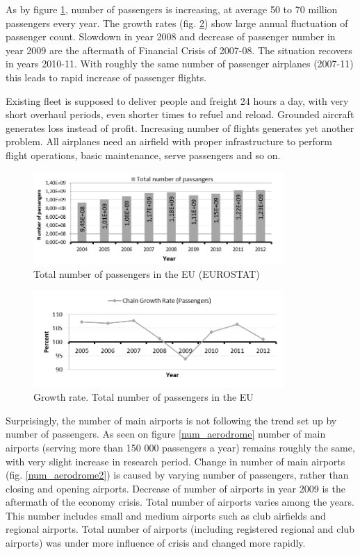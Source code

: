 As by figure \ref{num_pass}, number of passengers is increasing, at average 50 to 70 million passengers every year. The growth rates (fig. \ref{num_pass2}) show large annual fluctuation of passenger count. Slowdown in year 2008 and decrease of passenger number in year 2009 are the aftermath of Financial Crisis of 2007-08. The situation recovers in years 2010-11. With roughly the same number of passenger airplanes (2007-11) this leads to rapid increase of passenger flights.

Existing fleet is supposed to deliver people and freight 24 hours a day, with very short overhaul periods, even shorter times to refuel and reload. Grounded aircraft generates loss instead of profit. Increasing number of flights generates yet another problem. All airplanes need an airfield with proper infrastructure to perform flight operations, basic maintenance, serve passengers and so on.

\begin{figure}[h!]
\centering %
\includegraphics[width=0.85\textwidth]{Pictures/num_pass.png}
\caption{Total number of passengers in the EU (EUROSTAT)}
\label{num_pass}
\end{figure}

\begin{figure}[h!]
\centering %
\includegraphics[width=0.85\textwidth]{Pictures/num_pass2.png}
\caption{Growth rate. Total number of passengers in the EU}
\label{num_pass2}
\end{figure}

Surprisingly, the number of main airports is not following the trend set up by number of passengers.  As seen on figure \ref{num_aerodrome} number of main airports (serving more than 150 000 passengers a year) remains roughly the same, with very slight increase in research period. Change in number of main airports (fig. \ref{num_aerodrome2}) is caused by varying number of passengers, rather than closing and opening airports. Decrease of number of airports in year 2009 is the aftermath of the economy crisis. Total number of airports varies among the years. This number includes small and medium airports such as club airfields and regional airports. Total number of airports (including registered regional and club airports) was under more influence of crisis and changed more rapidly.

